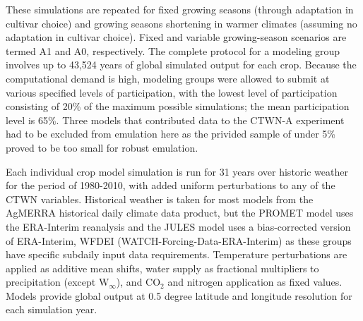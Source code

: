 \documentclass[gmd, manuscript]{copernicus} %
\begin{document}
These simulations are repeated for fixed growing seasons (through adaptation in cultivar choice) and growing seasons shortening in warmer climates (assuming no adaptation in cultivar choice). 
Fixed and variable growing-season scenarios are termed A1 and A0, respectively.
The complete protocol for a modeling group involves up to 43,524 years %
of global simulated output for each crop.
Because the computational demand is high, modeling groups were allowed to submit at various specified levels of participation, with the lowest level of participation consisting of 20\% of the maximum possible simulations; the mean participation level is 65\%. 
Three models that contributed data to the CTWN-A experiment \citep{franke2019ctwnexperiment} had to be excluded from emulation here as the privided sample of under 5\% proved to be too small for robust emulation.

Each individual crop model simulation is run for 31 years over historic weather for the period of 1980-2010, with added uniform perturbations to any of the CTWN variables.
Historical weather is taken for most models from the AgMERRA \citep{Ruane2015} historical daily climate data product, but the PROMET model uses the ERA-Interim reanalysis \citep{dee2011era} and the JULES model uses a bias-corrected version of ERA-Interim, WFDEI (WATCH-Forcing-Data-ERA-Interim) \citep{weedon2014wfdei} as these groups have specific subdaily input data requirements. 
Temperature perturbations are applied as additive mean shifts, water supply as fractional multipliers to precipitation (except W$_{\infty}$), and CO$_2$ and nitrogen application as fixed values. 
Models provide global output at 0.5 degree latitude and longitude resolution for each simulation year.

\end{document}
